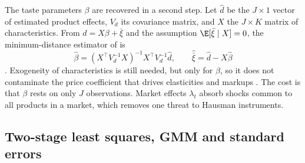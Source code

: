 The taste parameters $\beta$ are recovered in a second step. Let $\hat d$ be the $J \times 1$ vector of estimated
product effects, $V_d$ its covariance matrix, and $X$ the $J \times K$ matrix of characteristics. From $d = X\beta +
\bar\xi$ and the assumption $\E[\bar\xi \mid X] = 0$, the minimum-distance estimator of \citet{Chamberlain1982} is
\begin{equation}\label{eq:07-min-distance}
  \hat\beta = (X^\top V_d^{-1} X)^{-1} X^\top V_d^{-1}\hat d, \qquad \hat{\bar\xi} = \hat d - X\hat\beta
\end{equation}
\citep[pp.~322--323]{Nevo2001}. Exogeneity of characteristics is still needed, but only for $\beta$, so it does not
contaminate the price coefficient that drives elasticities and markups \citep[n.~19]{Nevo2001}. The cost is that
$\beta$ rests on only $J$ observations. Market effects $\lambda_t$ absorb shocks common to all products in a market,
which removes one threat to Hausman instruments.

\subsection{Two-stage least squares, GMM and standard errors}\label{sec:07-estimator}

